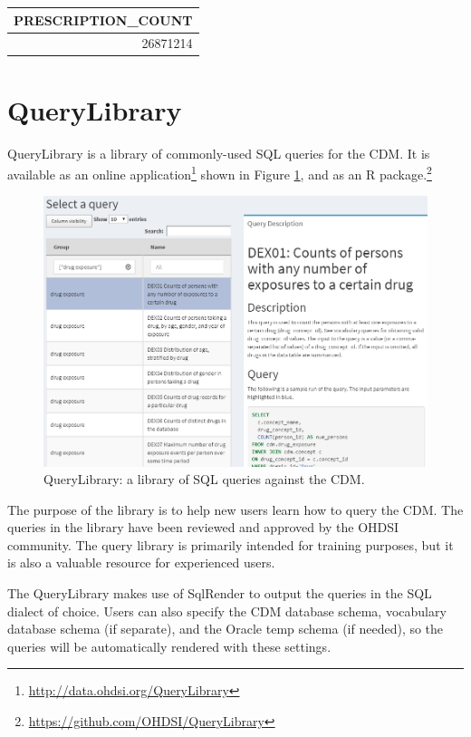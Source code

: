 \documentclass[11pt]{book}
\let\rmarkdownfootnote\footnote%
\def\footnote{\protect\rmarkdownfootnote}
\theoremstyle{definition}
\theoremstyle{definition}
\theoremstyle{definition}
\theoremstyle{remark}
\begin{document}
\begin{longtable}[]{@{}r@{}}
\toprule
PRESCRIPTION\_COUNT\tabularnewline
\midrule
\endhead
26871214\tabularnewline
\bottomrule
\end{longtable}

\section{QueryLibrary}\label{querylibrary}


QueryLibrary is a library of commonly-used SQL queries for the CDM. It
is available as an online application\footnote{\url{http://data.ohdsi.org/QueryLibrary}}
shown in Figure \ref{fig:queryLibrary}, and as an R package.\footnote{\url{https://github.com/OHDSI/QueryLibrary}}

\begin{figure}

{\centering \includegraphics[width=1\linewidth]{images/SqlAndR/queryLibrary} 

}

\caption{QueryLibrary: a library of SQL queries against the CDM.}\label{fig:queryLibrary}
\end{figure}

The purpose of the library is to help new users learn how to query the
CDM. The queries in the library have been reviewed and approved by the
OHDSI community. The query library is primarily intended for training
purposes, but it is also a valuable resource for experienced users.

The QueryLibrary makes use of SqlRender to output the queries in the SQL
dialect of choice. Users can also specify the CDM database schema,
vocabulary database schema (if separate), and the Oracle temp schema (if
needed), so the queries will be automatically rendered with these
settings.
\end{document}
